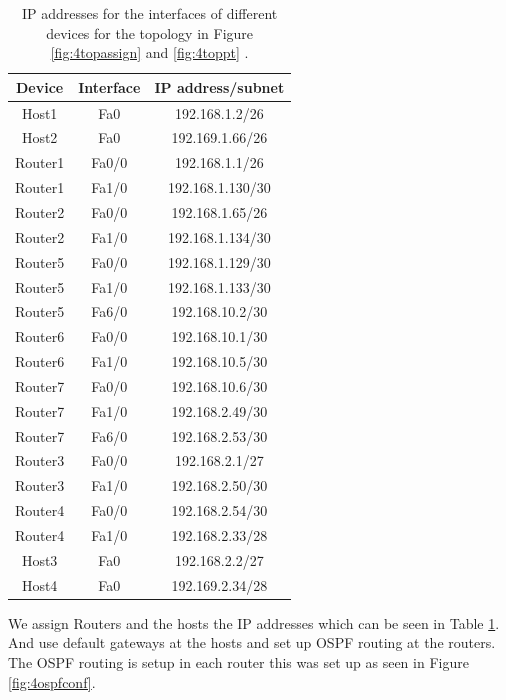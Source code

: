 \documentclass{article}
\begin{document}
\begin{table}[!h]
    \centering
    \begin{tabular}{c|c|c}
    \hline
        Device & Interface & IP address/subnet \\
        \hline
        Host1  & Fa0 &192.168.1.2/26 \\
        Host2 & Fa0 & 192.169.1.66/26 \\
        Router1 & Fa0/0 & 192.168.1.1/26 \\
        Router1 & Fa1/0 & 192.168.1.130/30 \\    
        Router2 & Fa0/0 & 192.168.1.65/26 \\
        Router2 & Fa1/0 & 192.168.1.134/30\\
        Router5 & Fa0/0 & 192.168.1.129/30 \\
        Router5 & Fa1/0 & 192.168.1.133/30 \\
        Router5 & Fa6/0 & 192.168.10.2/30 \\
        Router6 & Fa0/0 & 192.168.10.1/30 \\
        Router6 & Fa1/0 & 192.168.10.5/30 \\
        Router7 & Fa0/0 & 192.168.10.6/30 \\
        Router7 & Fa1/0 & 192.168.2.49/30 \\
        Router7 & Fa6/0 & 192.168.2.53/30 \\
        Router3 & Fa0/0 & 192.168.2.1/27 \\
        Router3 & Fa1/0 & 192.168.2.50/30 \\    
        Router4 & Fa0/0 & 192.168.2.54/30 \\
        Router4 & Fa1/0 & 192.168.2.33/28\\
        Host3  & Fa0 & 192.168.2.2/27 \\
        Host4 & Fa0 & 192.169.2.34/28 \\
        \hline
    \end{tabular}
    \caption{IP addresses for the interfaces of different devices for the topology in Figure \ref{fig:4topassign} and \ref{fig:4toppt} . }
    \label{tab:4ips}
\end{table}

We assign Routers and the hosts the IP addresses which can be seen in Table \ref{tab:4ips}. And use default gateways at the hosts and set up OSPF routing at the routers. The OSPF routing is setup in each router this was set up as seen in Figure \ref{fig:4ospfconf}. 
\end{document}
